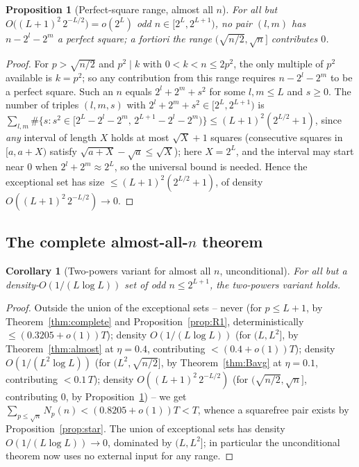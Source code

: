 \documentclass[11pt]{article}
\theoremstyle{plain}
\newtheorem{proposition}[theorem]{Proposition}
\newtheorem{corollary}[theorem]{Corollary}
\theoremstyle{definition}
\theoremstyle{remark}
\begin{document}
\begin{proposition}[Perfect-square range, almost all $n$]\label{prop:sqrange}
For all but $O\big((L+1)^2\,2^{-L/2}\big)=o(2^L)$ odd $n\in[2^L,2^{L+1})$, no pair
$(l,m)$ has $n-2^l-2^m$ a perfect square; a fortiori the range
$(\sqrt{n/2},\sqrt n]$ contributes $0$.
\end{proposition}
\begin{proof}
For $p>\sqrt{n/2}$ and $p^2\mid k$ with $0<k<n\le2p^2$, the only multiple of
$p^2$ available is $k=p^2$; so any contribution from this range requires
$n-2^l-2^m$ to be a perfect square. Such an $n$ equals $2^l+2^m+s^2$ for some
$l,m\le L$ and $s\ge0$. The number of triples $(l,m,s)$ with
$2^l+2^m+s^2\in[2^L,2^{L+1})$ is
$\sum_{l,m}\#\{s:s^2\in[2^L-2^l-2^m,\,2^{L+1}-2^l-2^m)\}\le(L+1)^2(2^{L/2}+1)$,
since \emph{any} interval of length $X$ holds at most $\sqrt X+1$ squares
(consecutive squares in $[a,a+X)$ satisfy $\sqrt{a+X}-\sqrt a\le\sqrt X$); here
$X=2^L$, and the interval may start near $0$ when $2^l+2^m\approx2^L$, so the
universal bound is needed. Hence the exceptional set has size
$\le(L+1)^2(2^{L/2}+1)$, of density $O((L+1)^2\,2^{-L/2})\to0$.
\end{proof}

\subsection{The complete almost-all-$n$ theorem}

\begin{corollary}[Two-powers variant for almost all $n$, unconditional]\label{cor:almostall}
For all but a density-$O(1/(L\log L))$ set of odd $n\le2^{L+1}$, the two-powers
variant holds.
\end{corollary}
\begin{proof}
Outside the union of the exceptional sets -- never (for $p\le L+1$, by
Theorem~\ref{thm:complete} and Proposition~\ref{prop:R1}, deterministically
$\le(0.3205+o(1))T$); density $O(1/(L\log L))$ (for $(L,L^2]$, by
Theorem~\ref{thm:almost} at $\eta=0.4$, contributing $<(0.4+o(1))T$); density
$O(1/(L^2\log L))$ (for $(L^2,\sqrt{n/2}]$, by Theorem~\ref{thm:Bavg} at
$\eta=0.1$, contributing $<0.1\,T$); density $O((L+1)^2\,2^{-L/2})$ (for
$(\sqrt{n/2},\sqrt n]$, contributing $0$, by Proposition~\ref{prop:sqrange}) -- we
get $\sum_{p\le\sqrt n}N_p(n)<(0.8205+o(1))T<T$, whence a squarefree pair exists by
Proposition~\ref{prop:star}. The union of exceptional sets has density
$O(1/(L\log L))\to0$, dominated by $(L,L^2]$; in particular the unconditional
theorem now uses no external input for any range.
\end{proof}
\end{document}
